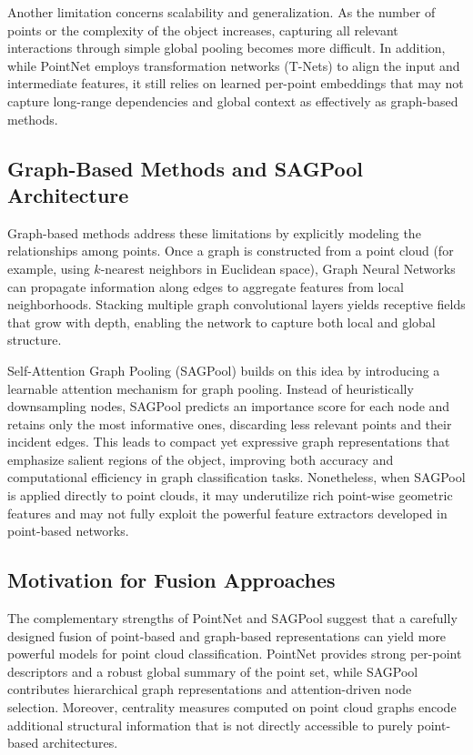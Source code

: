 \documentclass[conference]{IEEEtran}
\begin{document}
Another limitation concerns scalability and generalization. As the number of points or the complexity of the object increases, capturing all relevant interactions through simple global pooling becomes more difficult. In addition, while PointNet employs transformation networks (T-Nets) to align the input and intermediate features, it still relies on learned per-point embeddings that may not capture long-range dependencies and global context as effectively as graph-based methods.

\subsection{Graph-Based Methods and SAGPool Architecture}

Graph-based methods address these limitations by explicitly modeling the relationships among points. Once a graph is constructed from a point cloud (for example, using $k$-nearest neighbors in Euclidean space), Graph Neural Networks can propagate information along edges to aggregate features from local neighborhoods. Stacking multiple graph convolutional layers yields receptive fields that grow with depth, enabling the network to capture both local and global structure.

Self-Attention Graph Pooling (SAGPool) \cite{b2} builds on this idea by introducing a learnable attention mechanism for graph pooling. Instead of heuristically downsampling nodes, SAGPool predicts an importance score for each node and retains only the most informative ones, discarding less relevant points and their incident edges. This leads to compact yet expressive graph representations that emphasize salient regions of the object, improving both accuracy and computational efficiency in graph classification tasks. Nonetheless, when SAGPool is applied directly to point clouds, it may underutilize rich point-wise geometric features and may not fully exploit the powerful feature extractors developed in point-based networks.

\subsection{Motivation for Fusion Approaches}

The complementary strengths of PointNet and SAGPool suggest that a carefully designed fusion of point-based and graph-based representations can yield more powerful models for point cloud classification. PointNet provides strong per-point descriptors and a robust global summary of the point set, while SAGPool contributes hierarchical graph representations and attention-driven node selection. Moreover, centrality measures computed on point cloud graphs encode additional structural information that is not directly accessible to purely point-based architectures.
\end{document}

